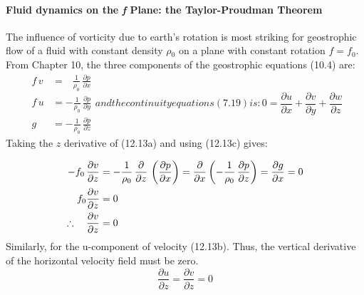 \paragraph{Fluid dynamics on the \textbf{\textit{f}} Plane: the Taylor-Proudman
Theorem} The
influence of vorticity due to earth's rotation is most striking for
geostrophic flow of a fluid with constant density $\rho{_0}$ on a
plane with constant rotation $f = f_0$. From Chapter 10, the three
components of the geostrophic equations (10.4) are:
\begin{subequations}
\begin{align}
f\,v &= \;\;\, \frac{1}{\rho_{0}}\,\frac{\partial{p}}{\partial{x}} \\
f\,u  &= -\frac{1}{\rho_{0}}\,\frac{\partial{p}}{\partial{y}} \\
g     &= -\frac{1}{\rho_{0}}\,\frac{\partial{p}}{\partial{z}}
\end{align}
and the continuity equations (7.19) is:
\begin{equation}
0 = \frac{\partial{u}}{\partial{x}} + \frac{\partial{v}}{\partial{y}} +
\frac{\partial{w}}{\partial{z}}
\end{equation}
\end{subequations}
Taking the $z$ derivative of (12.13a) and using (12.13c) gives:

\begin{align}
-f_0\,\frac{\partial{v}}{\partial{z}} &= -\frac{1}{\rho_{0}}\,\frac{\partial
}{\partial{z}}\,
\left(\frac{\partial{p}}{\partial{x}}\right) = \frac{\partial
}{\partial{x}}\left(-\frac{1}{\rho_{0}}\,\frac{\partial{p}}{\partial{z}}\right) =
\frac{\partial g}{\partial x}= 0
\notag \\
 f_{0} \frac{\partial{v}}{\partial{z}} &= 0 \notag \\
\therefore \quad \frac{\partial{v}}{\partial{z}} &= 0 \notag
\end{align}
Similarly, for the u-component of velocity (12.13b). Thus, the vertical derivative
of the horizontal velocity field must be zero.
\begin{equation}
\boxed{ \frac{\partial{u}}{\partial{z}} = \frac{\partial{v}}{\partial{z}} =0  }
\end{equation}

